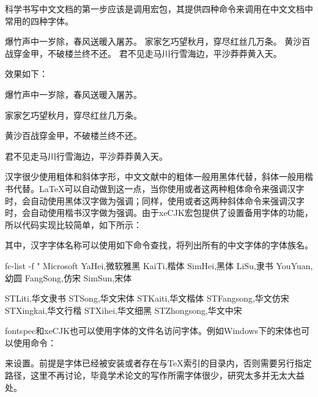 科学书写中文文档的第一步应该是调用\CTeX 宏包，其提供四种命令来调用在中文文档中常用的四种字体。

\begin{latex}
{\songti 爆竹声中一岁除，春风送暖入屠苏。}
{\fangsong 家家乞巧望秋月，穿尽红丝几万条。}
{\heiti 黄沙百战穿金甲，不破楼兰终不还。}
{\kaishu 君不见走马川行雪海边，平沙莽莽黄入天。}
\end{latex}

效果如下：

\begin{center}
	{\songti 爆竹声中一岁除，春风送暖入屠苏。}\par
	{\fangsong 家家乞巧望秋月，穿尽红丝几万条。}\par
	{\heiti 黄沙百战穿金甲，不破楼兰终不还。}\par
	{\kaishu 君不见走马川行雪海边，平沙莽莽黄入天。}
\end{center}

汉字很少使用粗体和斜体字形，中文文献中的粗体一般用黑体代替，斜体一般用楷书代替。\LaTeX 可以自动做到这一点，当你使用\code{\textbf{}}或者\code{\bfseries}这两种粗体命令来强调汉字时，会自动使用黑体汉字做为强调；同样，使用\code{\textit{}}或者\code{\itshape}这两种斜体命令来强调汉字时，会自动使用楷书汉字做为强调。由于xeCJK宏包提供了设置备用字体的功能，所以代码实现比较简单，如下所示：

\begin{latex}
\end{latex}

其中，汉字字体名称可以使用如下命令查找，将列出所有的中文字体的字体族名。

\begin{latex}
fc-list -f "%
Microsoft YaHei,微软雅黑
KaiTi,楷体
SimHei,黑体
LiSu,隶书
YouYuan,幼圆
FangSong,仿宋
SimSun,宋体

STLiti,华文隶书
STSong,华文宋体
STKaiti,华文楷体
STFangsong,华文仿宋
STXingkai,华文行楷
STXihei,华文细黑
STZhongsong,华文中宋
\end{latex}

fontspec和xeCJK也可以使用字体的文件名访问字体。例如Windows下的宋体也可以使用命令：
\begin{latex}
\end{latex}
来设置。前提是字体已经被安装或者存在与\TeX 索引的目录内，否则需要另行指定路径，这里不再讨论，毕竟学术论文的写作所需字体很少，研究太多并无太大益处。


